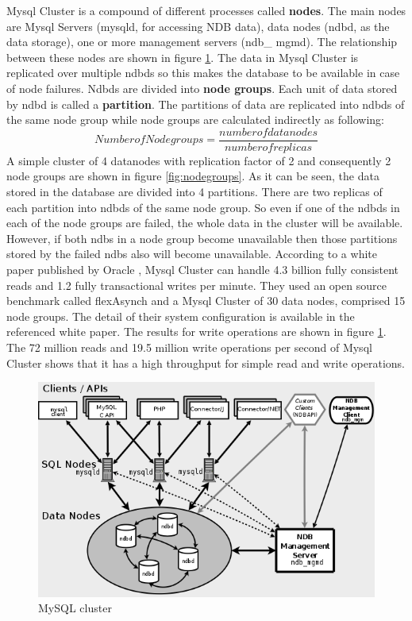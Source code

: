 Mysql  Cluster  is   a  compound  of  different  processes   called  \textbf{nodes}.  The  main  nodes   are
Mysql  Servers   (mysqld,  for  accessing  NDB  data),  data  nodes   (ndbd,  as   the  data  storage),
one  or  more  management  servers   (ndb\_ mgmd).  The  relationship  between  these  nodes   are
shown in figure \ref{fig:mysqlCluster}.
The  data  in Mysql Cluster is  replicated over multiple ndbds  so this  makes  the database to be
available  in  case  of  node  failures.  Ndbds   are  divided  into \textbf{node groups}.  Each  unit  of  data
stored  by   ndbd  is   called  a  \textbf{partition}.  The  partitions   of  data  are  replicated  into  ndbds   of  the
same node group while node groups are calculated indirectly as following:
$$Number of Node groups  = \frac{number of  datanodes}{number of  replicas} $$
A  simple  cluster  of  4  datanodes   with  replication  factor  of  2  and  consequently  2 node groups
are shown in figure \ref{fig:nodegroups}.
As   it  can  be  seen,  the  data stored in the database are divided into 4 partitions. There are two
replicas   of  each  partition  into  ndbds   of  the  same  node  group.  So  even  if  one  of the ndbds  in
each  of  the  node  groups   are  failed, the whole data in the cluster will be available. However, if
both  ndbs   in a node group become unavailable then those partitions  stored by  the failed ndbs
also will become unavailable.
According  to  a  white  paper  published  by   Oracle  ,  Mysql  Cluster  can  handle  4.3
billion  fully   consistent  reads   and  1.2  fully  transactional writes  per minute. They  used an open
source  benchmark   called  flexAsynch  and  a  Mysql  Cluster  of  30  data  nodes,  comprised  15
node  groups.  The  detail  of  their  system   configuration  is   available  in  the  referenced  white
paper. The results for write operations are shown in figure \ref{fig:mysqlCluster}.
The  72  million  reads   and  19.5  million  write  operations   per  second  of  Mysql  Cluster  shows
that it has a high throughput for simple read and write operations.
\pagebreak
\begin{figure}
\centering  
 \includegraphics[scale=0.65]{figs/preliminar/mysql_cluster.png}
  \caption{MySQL cluster}
  \label{fig:mysqlCluster}
\end{figure}

